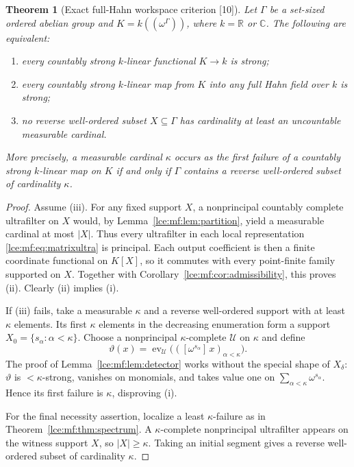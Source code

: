 \documentclass[11pt,letterpaper]{article}
\numberwithin{equation}{section}
\newtheorem{theorem}{Theorem}[section]
\theoremstyle{definition}
\theoremstyle{remark}
\newcommand{\R}{\mathbb R}
\newcommand{\C}{\mathbb C}
\newcommand{\coef}[2]{[\omega^{#1}]\,#2}
\newcommand{\abs}[1]{\lvert#1\rvert}
\newcommand{\thref}[1]{Theorem~\ref{#1}}
\newcommand{\leref}[1]{Lemma~\ref{#1}}
\newcommand{\src}[1]{\textup{\textsf{\small[#1]}}}%
\newcommand{\HF}[2]{#1((\omega^{#2}))}
\newcommand{\ev}{\operatorname{ev}}
\begin{document}
\begin{theorem}[Exact full-Hahn workspace criterion \src{10}]\label{lce:mf:thm:workspace}
Let $\Gamma$ be a set-sized ordered abelian group and $K=\HF k\Gamma$, where
$k=\R$ or $\C$. The following are equivalent:
\begin{enumerate}[label=\textup{(\roman*)}]
\item every countably strong $k$-linear functional $K\to k$ is strong;
\item every countably strong $k$-linear map from $K$ into any full Hahn
field over $k$ is strong;
\item no reverse well-ordered subset $X\subseteq\Gamma$ has cardinality at
least an uncountable measurable cardinal.
\end{enumerate}
More precisely, a measurable cardinal $\kappa$ occurs as the first failure
of a countably strong $k$-linear map on $K$ if and only if $\Gamma$ contains
a reverse well-ordered subset of cardinality $\kappa$.
\end{theorem}
\begin{proof}
Assume (iii). For any fixed support $X$, a nonprincipal countably complete
ultrafilter on $X$ would, by \leref{lce:mf:lem:partition}, yield a
measurable cardinal at most $\abs X$. Thus every ultrafilter in each local
representation \eqref{lce:mf:eq:matrixultra} is principal. Each output
coefficient is then a finite coordinate functional on $K[X]$, so it
commutes with every point-finite family supported on $X$. Together with
Corollary~\ref{lce:mf:cor:admissibility}, this proves (ii). Clearly (ii)
implies (i).

If (iii) fails, take a measurable $\kappa$ and a reverse well-ordered
support with at least $\kappa$ elements. Its first $\kappa$ elements in the
decreasing enumeration form a support $X_0=\{s_\alpha:\alpha<\kappa\}$.
Choose a nonprincipal $\kappa$-complete $\mathcal U$ on $\kappa$ and define
\[
 \vartheta(x)=\ev_{\mathcal U}\bigl((\coef{s_\alpha}x)_{\alpha<\kappa}\bigr).
\]
The proof of \leref{lce:mf:lem:detector} works without the special shape of
$X_\delta$: $\vartheta$ is ${<}\kappa$-strong, vanishes on monomials, and
takes value one on $\sum_{\alpha<\kappa}\omega^{s_\alpha}$. Hence its first
failure is $\kappa$, disproving (i).

For the final necessity assertion, localize a least $\kappa$-failure as in
\thref{lce:mf:thm:spectrum}. A $\kappa$-complete nonprincipal ultrafilter
appears on the witness support $X$, so $\abs X\ge\kappa$. Taking an initial
segment gives a reverse well-ordered subset of cardinality $\kappa$.
\end{proof}
\end{document}
